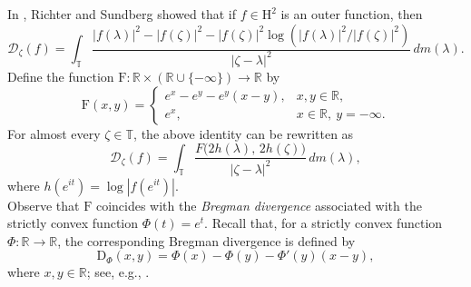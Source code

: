 \documentclass[12pt,reqno,a4paper]{amsart}
\newcommand{\hH}{\mathrm{H^2 }}
\newcommand\RR{\mathbb{R}}
\newcommand{\FF}{\mathrm{F}}
\newcommand{\cD}{{\mathcal{D}}}
\numberwithin{equation}{section}
\begin{document}
In \cite{RS1}, Richter and Sundberg showed that if \( f\in\hH \) is an outer function, then
\[
\cD_{\zeta}(f) = \int_{\mathbb{T}} \frac{|f(\lambda)|^2-|f(\zeta)|^2- |f(\zeta)|^2\log(|f(\lambda)|^2/|f(\zeta)|^2)}{|\zeta - \lambda|^2} \, dm(\lambda).
\]
Define the function \( \FF : \mathbb{R} \times (\mathbb{R} \cup \{-\infty\}) \to \mathbb{R} \) by
\[
\FF(x,y) =
\begin{cases}
	e^{x} - e^{y} - e^{y}(x-y), & x,y \in \mathbb{R}, \\
	e^{x}, & x \in \mathbb{R},\ y = -\infty.
\end{cases}
\]
For almost every \( \zeta \in \mathbb{T} \), the above identity can be rewritten as
\[
\mathcal{D}_{\zeta}(f)
=
\int_{\mathbb{T}}
\frac{F\big(2h(\lambda),\,2h(\zeta)\big)}{|\zeta - \lambda|^{2}} \, dm(\lambda),
\]
where \( h(e^{it}) = \log |f(e^{it})| \).\\
Observe that \(\FF\) coincides with the \textit{Bregman divergence} associated with the strictly convex function \(\Phi(t)=e^t\). Recall that, for a strictly convex function \(\Phi:\RR\to\RR\), the corresponding Bregman divergence is defined by
\[
\mathrm{D}_{\Phi}(x,y)
=
\Phi(x)-\Phi(y)-\Phi'(y)(x-y),
\]
where $x,y\in\RR$; see, e.g., \cite{Br}.
\end{document}

